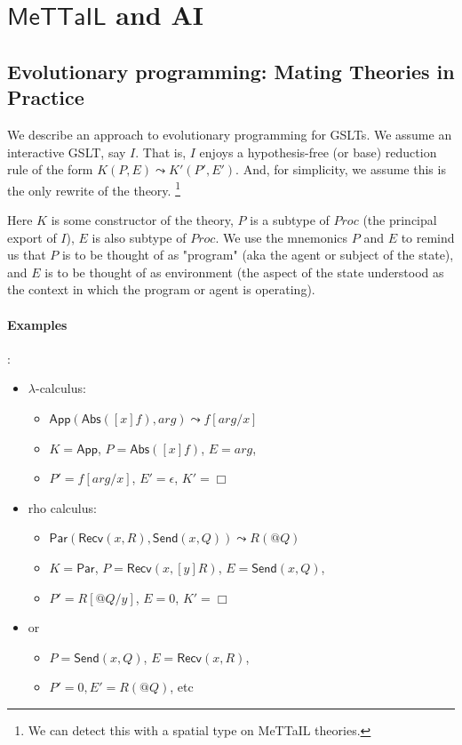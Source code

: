 \documentclass{article}
\begin{document}
\section{$\mathsf{MeTTaIL}$ and AI}

\subsection{Evolutionary programming: Mating Theories in Practice}

We describe an approach to evolutionary programming for GSLTs.  We
assume an interactive GSLT, say $I$. That is, $I$ enjoys a
hypothesis-free (or base) reduction rule of the form $K( P, E ) \leadsto K'(
P', E' )$.  And, for simplicity, we assume this is the only rewrite of
the theory. \footnote{We can detect this with a spatial type on
MeTTaIL theories.}

Here $K$ is some constructor of the theory, $P$ is a subtype of $Proc$
(the principal export of $I$), $E$ is also subtype of $Proc$. We use the
mnemonics $P$ and $E$ to remind us that $P$ is to be thought of as
"program" (aka the agent or subject of the state), and $E$ is to be
thought of as environment (the aspect of the state understood as
the context in which the program or agent is operating).

\paragraph{Examples}:
\begin{itemize}
\item $\lambda$-calculus:
  \begin{itemize}
  \item $\mathsf{App}( \mathsf{Abs}( [x]f ), arg ) \leadsto f[ arg / x ]$
  \item $K = \mathsf{App}$, $P = \mathsf{Abs}( [x]f )$, $E = arg$,
  \item $P' = f[ arg / x ]$, $E' = \epsilon$, $K' = \Box$  
  \end{itemize}
\item rho calculus:
  \begin{itemize}
    \item $\mathsf{Par}( \mathsf{Recv}( x, R ), \mathsf{Send}( x, Q ) ) \leadsto R( @Q )$
    \item $K = \mathsf{Par}$, $P = \mathsf{Recv}( x, [y]R )$, $E = \mathsf{Send}( x, Q )$,
    \item $P' = R[ @Q / y ]$, $E = 0$, $K' = \Box$    
  \end{itemize}
\item or
  \begin{itemize}
  \item $P = \mathsf{Send}( x, Q )$, $E = \mathsf{Recv}( x, R )$,
  \item $P' = 0, E' = R( @Q )$, etc
  \end{itemize}
\end{itemize}
\end{document}
